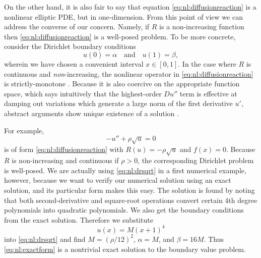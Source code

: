 On the other hand, it is also fair to say that equation \eqref{eq:nl:diffusionreaction} is a nonlinear elliptic PDE, but in one-dimension.  From this point of view we can address the converse of our concern.  Namely, if $R$ is a non-increasing function then \eqref{eq:nl:diffusionreaction} is a well-posed problem.  To be more concrete, consider the Dirichlet boundary conditions
\begin{equation}
u(0)=\alpha \quad \text{and} \quad u(1)=\beta,  \label{eq:nl:drbcs}
\end{equation}
wherein we have chosen a convenient interval $x\in[0,1]$.  In the case where $R$ is continuous and \emph{non}-increasing, the nonlinear operator in \eqref{eq:nl:diffusionreaction} is strictly-monotone \citep{KinderlehrerStampacchia1980}.  Because it is also coercive on the appropriate function space, which says intuitively that the highest-order $D u''$ term is effective at damping out variations which generate a large norm of the first derivative $u'$, abstract arguments show unique existence of a solution \citep[pages 93-94]{KinderlehrerStampacchia1980}.

For example,
\begin{equation}
-u'' + \rho \sqrt{u} = 0 \label{eq:nl:drsqrt}
\end{equation}
is of form \eqref{eq:nl:diffusionreaction} with $R(u) = - \rho \sqrt{u}$ and $f(x)=0$.  Because $R$ is non-increasing and continuous if $\rho>0$, the corresponding Dirichlet problem is well-posed.  We are actually using \eqref{eq:nl:drsqrt} in a first numerical example, however, because we want to verify our numerical solution using an exact solution, and its particular form makes this easy.  The solution is found by noting that both second-derivative and square-root operations convert certain 4th degree polynomials into quadratic polynomials.
We also get the boundary conditions from the exact solution.  Therefore we substitute
\begin{equation}
u(x)=M(x+1)^4 \label{eq:nl:exactform}
\end{equation}
into \eqref{eq:nl:drsqrt} and find $M=(\rho/12)^2$, $\alpha=M$, and $\beta=16 M$.  Thus \eqref{eq:nl:exactform} is a nontrivial exact solution to the boundary value problem.

